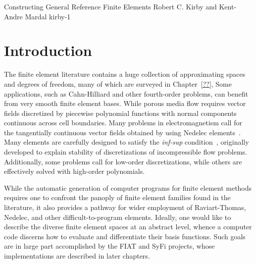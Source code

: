 \newcommand{\mathbfx}[1]{{\mbox{\boldmath $#1$}}}
\renewcommand{\P}{{\mathbb P}}
\renewcommand{\H}{{\mathbb H}}
\newcommand{\GG}{\mathbf{G}}
\newcommand{\kentc}[1]{\marginpar{\tiny KAM: #1}}
\newcommand{\rckc}[1]{\marginpar{\tiny RCK: #1}}

              {Constructing General Reference Finite Elements}
              {Robert C. Kirby and Kent-Andre Mardal}
              {kirby-1}

%




\section{Introduction}
The finite element literature contains a huge collection of
approximating spaces and degrees of freedom, many of which are
surveyed in Chapter~\ref{??},
Some applications, such as Cahn-Hilliard and
other fourth-order problems, can benefit from very smooth finite
element bases.  While porous media flow requires
vector fields discretized by piecewise polynomial functions with
normal components continuous across cell boundaries.  Many problems in
electromagnetism call for the tangentially continuous vector fields obtained
by using Nedelec elements~\cite{Nedelec80,Nedelec86}.  Many elements are carefully designed
to satisfy the \emph{inf-sup} condition~\cite{BrezziFortin1991,GiraultRaviart86},
originally developed to explain stability of discretizations of
incompressible flow problems.  Additionally, some problems call for low-order
discretizations, while others are effectively solved with high-order
polynomials.

While the automatic generation of computer programs for finite element
methods requires one to confront the panoply of  finite
element families found in the literature, it also provides a pathway
for wider employment of Raviart-Thomas, Nedelec, and other
difficult-to-program elements.
Ideally, one would like to
describe the diverse finite element spaces at an abstract level,
whence a computer code discerns how to evaluate and differentiate
their basis functions.  Such goals are in large part accomplished by
the FIAT and SyFi projects, whose implementations are described in
later chapters.

